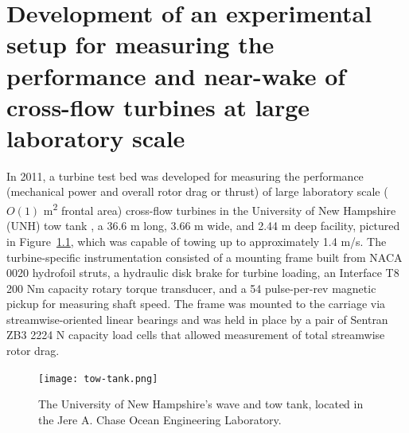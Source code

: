 \chapter{Development of an experimental setup for measuring the performance and
    near-wake of cross-flow turbines at large laboratory
    scale}\label{chap:exp-setup}

In 2011, a turbine test bed was developed for measuring the performance
(mechanical power and overall rotor drag or thrust) of large laboratory scale
($O(1)$ m\textsuperscript{2} frontal area) cross-flow turbines in the University
of New Hampshire (UNH) tow tank \cite{Bachant2011-MS}, a 36.6 m long, 3.66 m
wide, and 2.44 m deep facility, pictured in Figure~\ref{fig:tow-tank}, which was
capable of towing up to approximately 1.4 m/s. The turbine-specific
instrumentation consisted of a mounting frame built from NACA 0020 hydrofoil
struts, a hydraulic disk brake for turbine loading, an Interface T8 200 Nm
capacity rotary torque transducer, and a 54 pulse-per-rev magnetic pickup for
measuring shaft speed. The frame was mounted to the carriage via
streamwise-oriented linear bearings and was held in place by a pair of Sentran
ZB3 2224 N capacity load cells that allowed measurement of total streamwise
rotor drag.

\begin{figure}
    \centering

    \texttt{[image: tow-tank.png]}

    \caption{The University of New Hampshire's wave and tow tank, located in the
        Jere A. Chase Ocean Engineering Laboratory.}

    \label{fig:tow-tank}
\end{figure}

